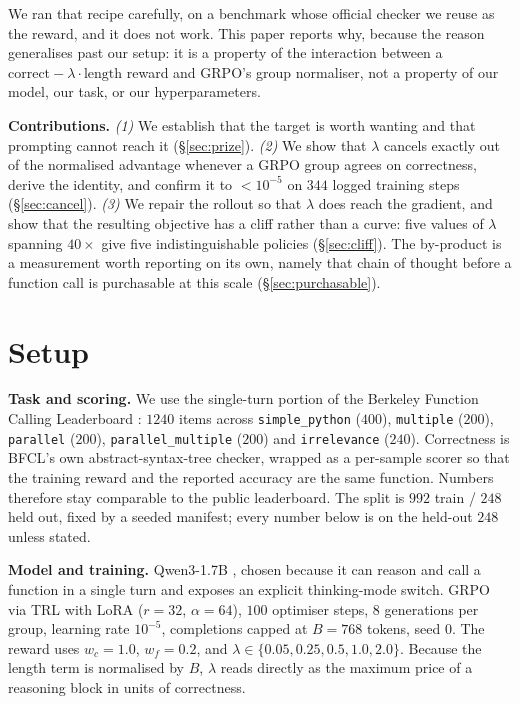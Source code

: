 \documentclass[10pt,twocolumn]{article}
\newcommand{\lam}{\lambda}
\begin{document}
We ran that recipe carefully, on a benchmark whose official checker we reuse as
the reward, and it does not work. This paper reports why, because the reason
generalises past our setup: it is a property of the interaction between a
$\text{correct}-\lam\cdot\text{length}$ reward and GRPO's group normaliser, not
a property of our model, our task, or our hyperparameters.

\textbf{Contributions.} \emph{(1)} We establish that the target is worth wanting
and that prompting cannot reach it (\S\ref{sec:prize}). \emph{(2)} We show that
$\lam$ cancels exactly out of the normalised advantage whenever a GRPO group
agrees on correctness, derive the identity, and confirm it to $<10^{-5}$ on
$344$ logged training steps (\S\ref{sec:cancel}). \emph{(3)} We repair the
rollout so that $\lam$ does reach the gradient, and show that the resulting
objective has a cliff rather than a curve: five values of $\lam$ spanning $40\times$
give five indistinguishable policies (\S\ref{sec:cliff}). The by-product is a
measurement worth reporting on its own, namely that chain of thought before a
function call is purchasable at this scale (\S\ref{sec:purchasable}).

\section{Setup}

\textbf{Task and scoring.} We use the single-turn portion of the Berkeley
Function Calling Leaderboard \cite{bfcl,patil2023gorilla}: $1240$ items across
\texttt{simple\_python} ($400$), \texttt{multiple} ($200$), \texttt{parallel}
($200$), \texttt{parallel\_multiple} ($200$) and \texttt{irrelevance} ($240$).
Correctness is BFCL's own abstract-syntax-tree checker, wrapped as a per-sample
scorer so that the training reward and the reported accuracy are the same
function. Numbers therefore stay comparable to the public leaderboard. The split
is $992$ train / $248$ held out, fixed by a seeded manifest; every number below
is on the held-out $248$ unless stated.

\textbf{Model and training.} Qwen3-1.7B \cite{qwen3}, chosen because it can
reason and call a function in a single turn and exposes an explicit
thinking-mode switch. GRPO via TRL \cite{trl} with LoRA \cite{hu2021lora}
($r{=}32$, $\alpha{=}64$), $100$ optimiser steps, $8$ generations per group,
learning rate $10^{-5}$, completions capped at $B{=}768$ tokens, seed $0$. The
reward uses $w_c{=}1.0$, $w_f{=}0.2$, and $\lam \in \{0.05, 0.25, 0.5, 1.0, 2.0\}$.
Because the length term is normalised by $B$, $\lam$ reads directly as the
maximum price of a reasoning block in units of correctness.
\end{document}
